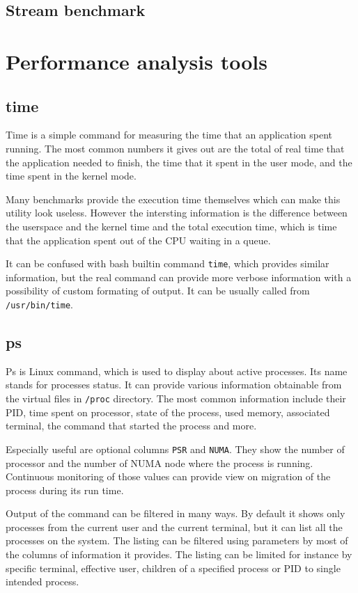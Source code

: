 \subsection{Stream benchmark}

\section{Performance analysis tools}

\subsection{time}
Time is a simple command for measuring the time that an application spent running. The
most common numbers it gives out are the total of real time that the application needed
to finish, the time that it spent in the user mode, and the time spent in the kernel mode.

Many benchmarks provide the execution time themselves which can make this
utility look useless. However the intersting information is the difference between
the userspace and the kernel time and the total execution time, which is time that
the application spent out of the CPU waiting in a queue.

It can be confused with bash builtin command \texttt{time}, which provides similar
information, but the real command can provide more verbose information with
a possibility of custom formating of output. It can be usually called from
\texttt{/usr/bin/time}.

\subsection{ps}
Ps is Linux command, which is used to display about active processes. Its name
stands for processes status. It can provide various information obtainable from
the virtual files in \texttt{/proc} directory. The most common information
include their PID, time spent on processor, state of the process, used memory,
associated terminal, the command that started the process and more.

Especially useful are optional columns \texttt{PSR} and \texttt{NUMA}. They
show the number of processor and the number of NUMA node where the process is
running. Continuous monitoring of those values can provide view on migration of
the process during its run time. 

Output of the command can be filtered in many ways. By default it shows only
processes from the current user and the current terminal, but it can list all
the processes on the system. The listing can be filtered using parameters by
most of the columns of information it provides. The listing can be limited for
instance by specific terminal, effective user, children of a specified process
or PID to single intended process.

